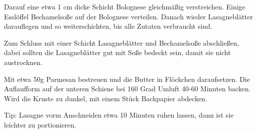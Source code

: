 {Darauf eine etwa 1 cm dicke Schicht Bolognese gleichm\"a\ss{}ig verstreichen.
Einige Essl\"offel Bechamelso\ss{}e auf der Bolognese verteilen.
Danach wieder Lasagnebl\"atter darauflegen und so weiterschichten, bis alle Zutaten verbraucht sind.

Zum Schluss mit einer Schicht Lasagnebl\"atter und Bechamelso\ss{}e abschließen, dabei sollten die Lasagnebl\"atter gut mit So\ss{}e bedeckt sein, damit sie nicht austrocknen.

Mit etwa 50g Parmesan bestreuen und die Butter in Fl\"ockchen daraufsetzen.
Die Auflaufform auf der unteren Schiene bei 160 Grad Umluft 40-60 Minuten backen.
Wird die Kruste zu dunkel, mit einem St\"uck Backpapier abdecken.

Tip: Lasagne vorm Anschneiden etwa 10 Minuten ruhen lassen, dann ist sie leichter zu portionieren. }
